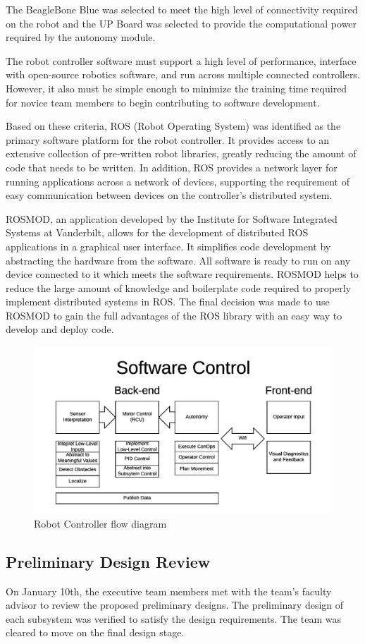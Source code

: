 \documentclass[class=article, crop=false]{standalone}
\begin{document}
	The BeagleBone Blue was selected to meet the high level of connectivity required on the robot and the UP Board was selected to provide the computational power required by the autonomy module.
	
	The robot controller software must support a high level of performance, interface with open-source robotics software, and run across multiple connected controllers. However, it also must be simple enough to minimize the training time required for novice team members to begin contributing to software development.
	
	Based on these criteria, ROS (Robot Operating System) was identified as the primary software platform for the robot controller. It provides access to an extensive collection of pre-written robot libraries, greatly reducing the amount of code that needs to be written. In addition, ROS provides a network layer for running applications across a network of devices, supporting the requirement of easy communication between devices on the controller’s distributed system. 
	
	ROSMOD, an application developed by the Institute for Software Integrated Systems at Vanderbilt, allows for the development of distributed ROS applications in a graphical user interface. It simplifies code development by abstracting the hardware from the software. All software is ready to run on any device connected to it which meets the software requirements. ROSMOD helps to reduce the large amount of knowledge and boilerplate code required to properly implement distributed systems in ROS. The final decision was made to use ROSMOD to gain the full advantages of the ROS library with an easy way to develop and deploy code.

	\FloatBarrier
	\begin{figure}[h]
	\centering
	 \includegraphics[width=0.8\linewidth]{09_Figures/data-control-high-level.jpg}
	 \caption{Robot Controller flow diagram}
	 \label{fig:data-control}
	\end{figure}
	\FloatBarrier
	
	
	
	\subsection{Preliminary Design Review}
	
	On January 10th, the executive team members met with the team’s faculty advisor to review the proposed preliminary designs. The preliminary design of each subsystem was verified to satisfy the design requirements. The team was cleared to move on the final design stage. 

	
	


	
\end{document}
